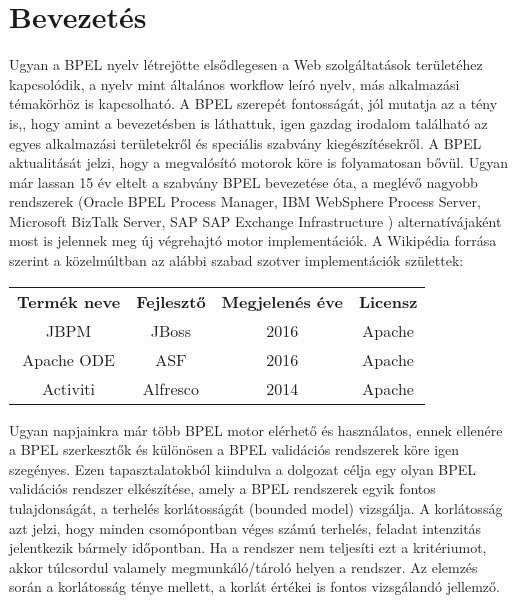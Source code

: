 

\chapter{Bevezetés}
Ugyan a BPEL nyelv létrejötte elsődlegesen a Web szolgáltatások területéhez kapcsolódik, a nyelv mint általános workflow leíró nyelv, más alkalmazási témakörhöz is kapcsolható. A BPEL szerepét fontosságát, jól mutatja az a tény is,, hogy  amint a bevezetésben is láthattuk, igen gazdag irodalom található az egyes alkalmazási területekről és speciális szabvány kiegészítésekről.  A  BPEL aktualitását jelzi, hogy a megvalósító motorok köre is folyamatosan bővül. Ugyan már lassan 15 év eltelt a szabvány BPEL bevezetése óta, a meglévő nagyobb rendszerek (Oracle BPEL Process Manager, IBM WebSphere Process Server, Microsoft BizTalk Server, SAP SAP Exchange Infrastructure ) alternatívájaként  most is jelennek meg új végrehajtó motor implementációk. A Wikipédia forrása szerint \cite{wikiBpelList} a közelmúltban az alábbi szabad szotver implementációk születtek:
\begin{center}
\begin{tabular}{|c|c|c|c|}
\hline
\textbf{Termék neve} & \textbf{Fejlesztő} & \textbf{Megjelenés éve} & \textbf{Licensz}\\
JBPM & JBoss & 2016 & Apache\\
\hline
Apache ODE & ASF & 2016 & Apache\\
\hline
Activiti & Alfresco & 2014 & Apache\\
\hline
\end{tabular}
\end{center}

Ugyan napjainkra már több BPEL motor elérhető és használatos, ennek ellenére a BPEL szerkesztők és különösen a BPEL validációs rendszerek köre igen szegényes. Ezen tapasztalatokból kiindulva a dolgozat célja egy olyan BPEL validációs rendszer elkészítése, amely a BPEL rendszerek egyik fontos tulajdonságát, a terhelés korlátosságát (bounded model)   vizsgálja. A korlátosság azt jelzi, hogy minden csomópontban véges számú terhelés, feladat intenzitás jelentkezik bármely időpontban. Ha a rendszer nem teljesíti ezt a kritériumot, akkor túlcsordul valamely megmunkáló/tároló helyen a rendszer. Az elemzés során a korlátosság ténye mellett, a korlát értékei is fontos vizsgálandó jellemző. 

